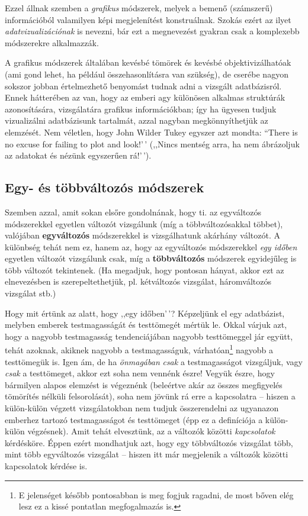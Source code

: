 \documentclass[
]{book}
\begin{document}
Ezzel állnak szemben a \emph{grafikus} módszerek, melyek a bemenő (számszerű) információból valamilyen képi megjelenítést konstruálnak. Szokás ezért az ilyet \emph{adatvizualizációnak} is nevezni, bár ezt a megnevezést gyakran csak a komplexebb módszerekre alkalmazzák.

A grafikus módszerek általában kevésbé tömörek és kevésbé objektivizálhatóak (ami gond lehet, ha például összehasonlításra van szükség), de cserébe nagyon sokszor jobban értelmezhető benyomást tudnak adni a vizsgált adatbázisról. Ennek hátterében az van, hogy az emberi agy különösen alkalmas struktúrák azonosítására, vizsgálatára grafikus információkban; így ha ügyesen tudjuk vizualizálni adatbázisunk tartalmát, azzal nagyban megkönnyíthetjük az elemzését. Nem véletlen, hogy John Wilder Tukey egyszer azt mondta: ``There is no excuse for failing to plot and look!'\,' (,,Nincs mentség arra, ha nem ábrázoljuk az adatokat és nézünk egyszerűen rá!'\,').

\hypertarget{deskriptivcsoportositasegytobbvalt}{%
\subsection{Egy- és többváltozós módszerek}\label{deskriptivcsoportositasegytobbvalt}}

Szemben azzal, amit sokan elsőre gondolnának, hogy ti. az egyváltozós módszerekkel egyetlen változót vizsgálunk (míg a többváltozósakkal többet), valójában \textbf{egyváltozós} módszerekkel is vizsgálhatunk akárhány változót. A különbség tehát nem ez, hanem az, hogy az egyváltozós módszerekkel \emph{egy időben} egyetlen változót vizsgálunk csak, míg a \textbf{többváltozós} módszerek egyidejűleg is több változót tekintenek. (Ha megadjuk, hogy pontosan hányat, akkor ezt az elnevezésben is szerepeltethetjük, pl. kétváltozós vizsgálat, háromváltozós vizsgálat stb.)

Hogy mit értünk az alatt, hogy ,,egy időben'\,'? Képzeljünk el egy adatbázist, melyben emberek testmagasságát és testtömegét mértük le. Okkal várjuk azt, hogy a nagyobb testmagasság tendenciájában nagyobb testtömeggel jár együtt, tehát azoknak, akiknek nagyobb a testmagasságuk, várhatóan\footnote{E jelenséget később pontosabban is meg fogjuk ragadni, de most bőven elég lesz ez a kissé pontatlan megfogalmazás is.} nagyobb a testtömegük is. Igen ám, de ha \emph{önmagában} \emph{csak} a testmagasságot vizsgáljuk, vagy \emph{csak} a testtömeget, akkor ezt soha nem vennénk észre! Vegyük észre, hogy bármilyen alapos elemzést is végeznénk (beleértve akár az összes megfigyelés tömörítés nélküli felsorolását), soha nem jövünk rá erre a kapcsolatra -- hiszen a külön-külön végzett vizsgálatokban nem tudjuk összerendelni az ugyanazon emberhez tartozó testmagasságot és testtömeget (épp ez a definíciója a külön-külön végzésnek). Amit tehát elvesztünk, az a változók közötti \emph{kapcsolatok} kérdésköre. Éppen ezért mondhatjuk azt, hogy egy többváltozós vizsgálat több, mint több egyváltozós vizsgálat -- hiszen itt már megjelenik a változók közötti kapcsolatok kérdése is.
\end{document}
